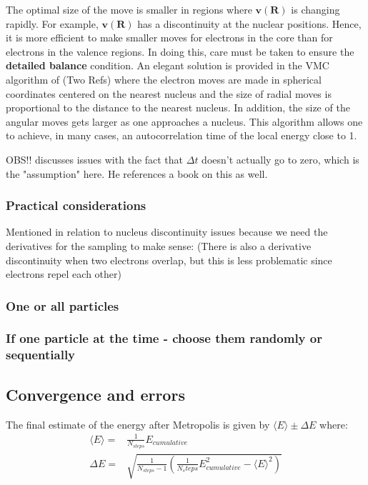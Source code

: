 \documentclass[twoside,english]{uiofysmaster}
\begin{document}
The optimal size of the move is smaller in regions where $\bm{v}(\bm{R})$ is changing rapidly. For example, $\bm{v}(\bm{R})$ has a discontinuity at the nuclear positions. Hence, it is more efficient to make smaller moves for electrons in the core than for electrons in the valence regions. In doing this, care must be taken to ensure the \textbf{detailed balance} condition. An elegant solution is provided in the VMC algorithm of (Two Refs) where the electron moves are made in spherical coordinates centered on the nearest nucleus and the size of radial moves is proportional to the distance to the nearest nucleus.
In addition, the size of the angular moves gets larger as one approaches a nucleus. This algorithm allows one to achieve, in many cases, an autocorrelation time of the local energy close to 1.
\cite{Toulouse2016}

OBS!! \cite{Lervag2010} discusses issues with the fact that $\Delta t$ doesn't actually go to zero, which is the "assumption" here. He references a book on this as well.

\subsubsection{Practical considerations}
Mentioned in relation to nucleus discontinuity issues because we need the derivatives for the sampling to make sense: (There is also a derivative discontinuity when two electrons overlap, but this is less problematic since electrons repel each other)
\cite{Umrigar1999}

\subsubsection{One or all particles}
\subsubsection{If one particle at the time - choose them randomly or sequentially}
\subsection{Convergence and errors}

The final estimate of the energy after Metropolis is given by $\langle E \rangle \pm \Delta E$ where:
\begin{align}
	\langle E \rangle =& \frac{1}{N_{steps}} E_{cumulative} \\
	\Delta E =& \sqrt{ \frac{1}{N_{steps}-1} ( \frac{1}{N_steps} E_{cumulative}^2 - \langle E \rangle^2 ) }
\end{align}
\end{document}

